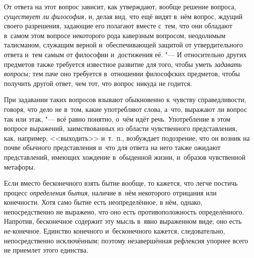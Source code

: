 От ответа на этот вопрос зависит, как утверждают, вообще решение вопроса,
{\em существует ли философия,} и, делая вид, что ещё
видят в~нём вопрос, ждущий своего разрешения, задающие его полагают вместе
с~тем, что они обладают в~самом этом вопросе некоторого рода каверзным
вопросом, неодолимым талисманом, служащим верной и~обеспечивающей защитой
от утвердительного ответа и~тем самым от философии и~достижения её. "--- И
относительно других предметов также требуется известное развитие для того,
чтобы уметь {\em задавать вопросы;} тем паче оно
требуется в~отношении философских предметов, чтобы получить другой ответ,
чем тот, что вопрос никуда не годится.

При задавании таких вопросов взывают обыкновенно к~чувству справедливости,
говоря, что дело не в~том, какие употребляют слова, а~что, выражают ли
вопрос так или этак, "--- всё равно понятно, о~чём идёт речь. Употребление в
этом вопросе выражений, заимствованных из области чувственного
представления, как, например, <<выходить>> и~т.~п., возбуждает подозрение,
что он возник на почве обычного представления и~что для ответа на него
также ожидают представлений, имеющих хождение в~обыденной жизни, и~образов
чувственной метафоры.

Если вместо бесконечного взять бытие вообще, то кажется, что легче постичь
процесс {\em определения бытия,} наличие в~нём
некоторого отрицания или конечности. Хотя само бытие есть неопределённое, в
нём, однако, непосредственно не выражено, что оно есть противоположность
определённого. Напротив, бесконечное содержит эту мысль в~явно выраженном
виде; оно есть {\em не}{}-конечное. Единство конечного
и~бесконечного кажется, следовательно, непосредственно исключённым; поэтому
незавершённая рефлексия упорнее всего не приемлет этого единства.

